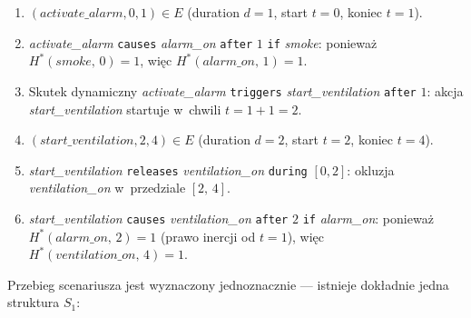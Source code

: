 \documentclass[12pt,a4paper]{article}
\newcommand{\langkw}[1]{\texttt{#1}}
\newcommand{\langvar}[1]{\textit{#1}}
\begin{document}
\begin{enumerate}[label=\arabic*.]
    \item $(activate\_alarm, 0, 1) \in E$ (duration $d=1$, start $t=0$, koniec $t=1$).
    \item \langvar{activate\_alarm} \langkw{causes} \langvar{alarm\_on} \langkw{after} $1$ \langkw{if} \langvar{smoke}: ponieważ $H^*(\textit{smoke},\,0)=1$, więc $H^*(\textit{alarm\_on},\,1)=1$.
    \item Skutek dynamiczny \langvar{activate\_alarm} \langkw{triggers} \langvar{start\_ventilation} \langkw{after} $1$: akcja \langvar{start\_ventilation} startuje w~chwili $t = 1 + 1 = 2$.
    \item $(start\_ventilation, 2, 4) \in E$ (duration $d=2$, start $t=2$, koniec $t=4$).
    \item \langvar{start\_ventilation} \langkw{releases} \langvar{ventilation\_on} \langkw{during} $[0,2]$: okluzja \langvar{ventilation\_on} w~przedziale $[2,\,4]$.
    \item \langvar{start\_ventilation} \langkw{causes} \langvar{ventilation\_on} \langkw{after} $2$ \langkw{if} \langvar{alarm\_on}: ponieważ $H^*(\textit{alarm\_on},\,2)=1$ (prawo inercji od $t=1$), więc $H^*(\textit{ventilation\_on},\,4)=1$.
\end{enumerate}

Przebieg scenariusza jest wyznaczony jednoznacznie --- istnieje dokładnie jedna struktura $S_1$:

\begin{center}
\end{center}
\end{document}
